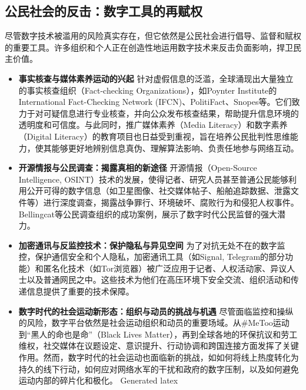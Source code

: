 \documentclass[UTF8, 10pt]{ctexbook}
\begin{document}
\subsection{公民社会的反击：数字工具的再赋权}
尽管数字技术被滥用的风险真实存在，但它依然是公民社会进行倡导、监督和赋权的重要工具。许多组织和个人正在创造性地运用数字技术来反击负面影响，捍卫民主价值。
\begin{itemize}
    \item \textbf{事实核查与媒体素养运动的兴起}
    针对虚假信息的泛滥，全球涌现出大量独立的事实核查组织（Fact-checking Organizations），如Poynter Institute的International Fact-Checking Network (IFCN)、PolitiFact、Snopes等。它们致力于对可疑信息进行专业核查，并向公众发布核查结果，帮助提升信息环境的透明度和可信度。与此同时，推广媒体素养（Media Literacy）和数字素养（Digital Literacy）的教育项目也日益受到重视，旨在培养公民批判性思维能力，使其能够更好地辨别信息真伪、理解算法影响、负责任地参与网络互动。

    \item \textbf{开源情报与公民调查：揭露真相的新途径}
    开源情报（Open-Source Intelligence, OSINT）技术的发展，使得记者、研究人员甚至普通公民能够利用公开可得的数字信息（如卫星图像、社交媒体帖子、船舶追踪数据、泄露文件等）进行深度调查，揭露战争罪行、环境破坏、腐败行为和侵犯人权事件。Bellingcat等公民调查组织的成功案例，展示了数字时代公民监督的强大潜力。

    \item \textbf{加密通讯与反监控技术：保护隐私与异见空间}
    为了对抗无处不在的数字监控，保护通信安全和个人隐私，加密通讯工具（如Signal, Telegram的部分功能）和匿名化技术（如Tor浏览器）被广泛应用于记者、人权活动家、异议人士以及普通网民之中。这些技术为他们在高压环境下安全交流、组织活动和传递信息提供了重要的技术保障。

    \item \textbf{数字时代的社会运动新形态：组织与动员的挑战与机遇}
    尽管面临监控和操纵的风险，数字平台依然是社会运动组织和动员的重要场域。从\#MeToo运动到“黑人的命也是命”（Black Lives Matter），再到全球各地的环保抗议和劳工维权，社交媒体在议题设定、意识提升、行动协调和跨国连接方面发挥了关键作用。然而，数字时代的社会运动也面临新的挑战，如如何将线上热度转化为持久的线下行动，如何应对网络水军的干扰和政府的数字压制，以及如何避免运动内部的碎片化和极化。
Generated latex
\end{itemize}
\end{document}
